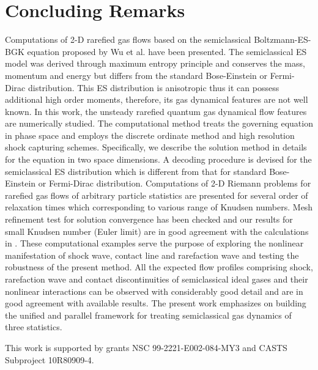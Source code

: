 \documentclass[twoside,twocolumn,prc,floats,amsmath,amssymb]{revtex4} %
\begin{document}
\section{Concluding Remarks}
Computations of 2-D rarefied gas flows based on the semiclassical Boltzmann-ES-BGK equation proposed by Wu et al. \cite{Wu2012} have been presented.  The semiclassical ES model was derived through maximum entropy principle and conserves the mass, momentum and energy but differs from the standard Bose-Einstein or Fermi-Dirac distribution. This ES distribution is anisotropic thus it can possess additional high order moments, therefore, its gas dynamical features are not well known. In this work, the unsteady rarefied quantum gas dynamical flow features are numerically studied.  The computational method treats the governing equation in phase space and employs the discrete ordinate method and high resolution shock capturing schemes. Specifically, we describe the solution method in details for the equation in two space dimensions.   A decoding procedure is devised for the semiclassical ES distribution which is different from that for standard Bose-Einstein or Fermi-Dirac distribution.  Computations of 2-D Riemann problems for rarefied gas flows of arbitrary particle statistics are presented for several order of relaxation times which corresponding to various range of Knudsen numbers.  Mesh refinement test for solution convergence has been checked and our results for small Knudsen number (Euler limit) are in good agreement with the calculations in \cite{Laxliu1995}\cite{Rinne1993}.    These computational examples serve the purpose of exploring the nonlinear manifestation of shock wave, contact line and rarefaction wave and testing the robustness of the present method. All the expected flow profiles comprising shock, rarefaction wave and contact discontinuities of semiclassical ideal gases and their nonlinear interactions can be observed with considerably good detail and are in good agreement with available results. The present work emphasizes on building the unified and parallel framework for treating semiclassical gas dynamics of three statistics. 

This work is supported by grants NSC 99-2221-E002-084-MY3 and CASTS Subproject 10R80909-4.
\end{document}
